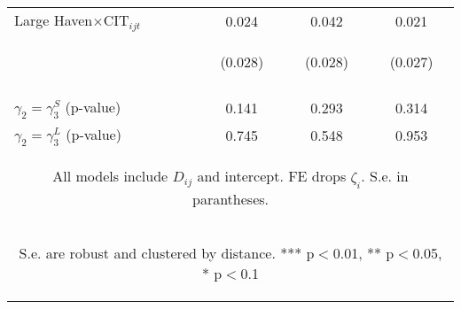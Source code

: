 \begin{center}
\begin{tabular}{lccc}
Large Haven$\times\text{CIT}_{ijt}$ & 0.024 & 0.042 & 0.021 \\
 & \begin{footnotesize}(0.028)\end{footnotesize} & \begin{footnotesize}(0.028)\end{footnotesize} & \begin{footnotesize}(0.027)\end{footnotesize} \\
\vspace{4pt} & \begin{footnotesize}\end{footnotesize} & \begin{footnotesize}\end{footnotesize} & \begin{footnotesize}\end{footnotesize} \\
$\gamma_2=\gamma^S_3$ (p-value) & 0.141 & 0.293 & 0.314 \\
 $\gamma_2=\gamma^L_3 $ (p-value) & 0.745 & 0.548 & 0.953 \\ \hline
\multicolumn{4}{c}{\begin{footnotesize} All models include $ D_{ij}$ and intercept. FE drops $\zeta_i$. S.e. in parantheses.\end{footnotesize}} \\
\multicolumn{4}{c}{\begin{footnotesize} S.e. are robust and clustered by distance. *** p$<$0.01, ** p$<$0.05, * p$<$0.1\end{footnotesize}} \\
\end{tabular}
\end{center}
